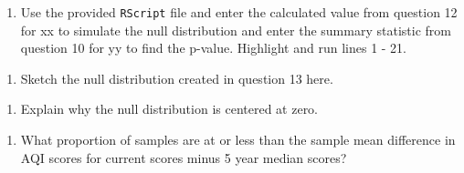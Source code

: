 \documentclass[
]{report}
\newenvironment{Shaded}{\begin{snugshade}}{\end{snugshade}}
\newcommand{\CommentTok}[1]{\textcolor[rgb]{0.56,0.35,0.01}{\textit{#1}}}
\newcommand{\DataTypeTok}[1]{\textcolor[rgb]{0.13,0.29,0.53}{#1}}
\newcommand{\DecValTok}[1]{\textcolor[rgb]{0.00,0.00,0.81}{#1}}
\newcommand{\KeywordTok}[1]{\textcolor[rgb]{0.13,0.29,0.53}{\textbf{#1}}}
\newcommand{\NormalTok}[1]{#1}
\newcommand{\OperatorTok}[1]{\textcolor[rgb]{0.81,0.36,0.00}{\textbf{#1}}}
\newcommand{\StringTok}[1]{\textcolor[rgb]{0.31,0.60,0.02}{#1}}
\providecommand{\tightlist}{%
  \setlength{\itemsep}{0pt}\setlength{\parskip}{0pt}}
\begin{document}
\vspace{.7in}

\begin{enumerate}
\def\labelenumi{\arabic{enumi}.}
\setcounter{enumi}{12}
\tightlist
\item
  Use the provided \texttt{RScript} file and enter the calculated value from question 12 for xx to simulate the null distribution and enter the summary statistic from question 10 for yy to find the p-value. Highlight and run lines 1 - 21.
\end{enumerate}

\begin{Shaded}
\end{Shaded}

\begin{enumerate}
\def\labelenumi{\arabic{enumi}.}
\setcounter{enumi}{13}
\tightlist
\item
  Sketch the null distribution created in question 13 here.
\end{enumerate}

\vspace{2in}

\begin{enumerate}
\def\labelenumi{\arabic{enumi}.}
\setcounter{enumi}{14}
\tightlist
\item
  Explain why the null distribution is centered at zero.
\end{enumerate}

\vspace{.5in}

\begin{enumerate}
\def\labelenumi{\arabic{enumi}.}
\setcounter{enumi}{15}
\tightlist
\item
  What proportion of samples are at or less than the sample mean difference in AQI scores for current scores minus 5 year median scores?
\end{enumerate}
\end{document}
